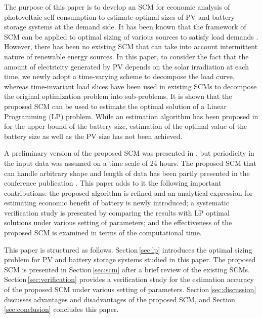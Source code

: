 \documentclass[lettersize,journal]{IEEEtran}
\newcommand{\secref}[1]{Section\,\ref{#1}}
\begin{document}
%
The purpose of this paper is to develop an SCM for economic analysis of photovoltaic self-consumption to estimate optimal sizes of PV and battery storage systems at the demand side. 
It has been known that the framework of SCM can be applied to optimal sizing of various sources to satisfy load demands \cite{stoft02,priya14}. 
However, there has been no existing SCM that can take into account intermittent nature of renewable energy sources. 
In this paper, to consider the fact that the amount of electricity generated by PV depends on the solar irradiation at each time, we newly adopt a time-varying scheme to decompose the load curve, whereas time-invariant load slices have been used in existing SCMs to decompose the original optimization problem into sub-problems. 
It is shown that the proposed SCM can be used to estimate the optimal solution of a Linear Programming (LP) problem. 
While an estimation algorithm has been proposed in \cite{ru14} for the upper bound of the battery size, estimation of the optimal value of the battery size as well as the PV size has not been achieved. 

%
A preliminary version of the proposed SCM was presented in \cite{hoshino21}, but periodicity in the input data was assumed on a time scale of 24 hours. 
The proposed SCM that can handle arbitrary shape and length of data has been partly presented in the conference publication \cite{hoshino22:nolta}. %
This paper adds to it the following important contributions:
the proposed algorithm is refined and an analytical expression for estimating economic benefit of battery is newly introduced; 
a systematic verification study is presented by comparing the results with LP optimal solutions under various setting of parameters; %
and the effectiveness of the proposed SCM is examined in terms of the computational time.  

%
This paper is structured as follows. 
\secref{sec:lp} introduces the optimal sizing problem for PV and battery storage systems studied in this paper. 
The proposed SCM is presented in \secref{sec:scm} after a brief review of the existing SCMs. 
\secref{sec:verification} provides a verification study for the estimation accuracy of the proposed SCM under various setting of parameters. 
\secref{sec:discussion} discusses advantages and disadvantages of the proposed SCM, and \secref{sec:conclusion} concludes this paper. 
\end{document}
